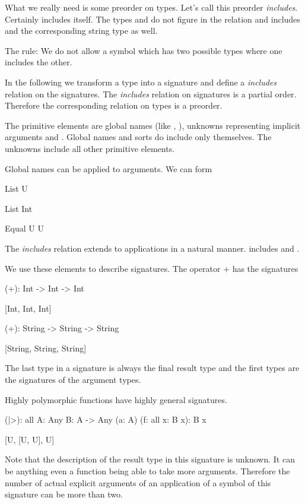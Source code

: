 What we really need is some preorder on types. Let's call this preorder
\emph{includes}. Certainly  includes itself. The types
 and  do not figure in
the relation and  includes  and the corresponding string type as well.

The rule: We do not allow a symbol which has two possible types where one
includes the other.

In the following we transform a type into a signature and define a
\emph{includes} relation on the signatures. The \emph{includes} relation on
signatures is a partial order. Therefore the corresponding relation on types is
a preorder.

The primitive elements are global names (like , ), unknowns
 representing implicit arguments and . Global names and sorts
do include only themselves. The unknowns include all other primitive elements.

Global names can be applied to arguments. We can form
\begin{alba}
    List U

    List Int

    Equal U U \end{alba}
%
The \emph{includes} relation extends to applications in a natural manner.
 includes  and .

We use these elements to describe signatures. The operator $+$ has the
signatures
%
\begin{alba}
    (+): Int -> Int -> Int

        [Int, Int, Int]


    (+): String -> String -> String

        [String, String, String]
\end{alba}
%
The last type in a signature is always the final result type and the first types
are the signatures of the argument types.


Highly polymorphic functions have highly general signatures.
%
\begin{alba}
    (|>): all {A: Any} {B: A -> Any} (a: A) (f: all {x}: B x): B x

        [U, [U, U], U]
\end{alba}
%
Note that the description of the result type in this signature is unknown. It
can be anything even a function being able to take more arguments. Therefore the
number of actual explicit arguments of an application of a symbol of this
signature can be more than two.

